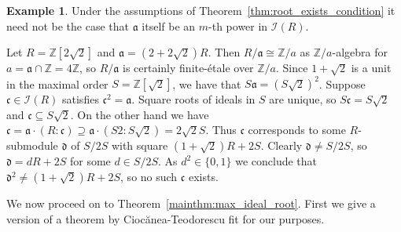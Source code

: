 \documentclass{amsart}
\theoremstyle{plain}
\theoremstyle{definition}
\newtheorem{example}[theorem]{Example}
\newcommand{\Z}{\ensuremath{\mathbb{Z}}}
\begin{document}
\begin{example}
Under the assumptions of Theorem~\ref{thm:root_exists_condition} it need not be the case that \(\mathfrak{a}\) itself be an \(m\)-th power in \(\mathcal{I}(R)\).

Let \(R=\Z[2\sqrt{2}]\) and \(\mathfrak{a}=(2+2\sqrt{2})R\). 
Then \(R/\mathfrak{a}\cong \Z/a\) as \(\Z/a\)-algebra for \(a=\mathfrak{a}\cap \Z=4\Z\), so \(R/\mathfrak{a}\) is certainly finite-\'etale over \(\Z/a\).
Since \(1+\sqrt{2}\) is a unit in the maximal order \(S=\Z[\sqrt{2}]\), we have that \(S\mathfrak{a}=(S\sqrt{2})^2\).
Suppose \(\mathfrak{c}\in\mathcal{I}(R)\) satisfies \(\mathfrak{c}^2=\mathfrak{a}\).
Square roots of ideals in \(S\) are unique, so \(S\mathfrak{c}=S\sqrt{2}\) and \(\mathfrak{c}\subseteq S\sqrt{2}\).
On the other hand we have \(\mathfrak{c}=\mathfrak{a}\cdot (R:\mathfrak{c}) \supseteq \mathfrak{a} \cdot (S2 : S\sqrt{2}) = 2\sqrt{2} S\).
Thus \(\mathfrak{c}\) corresponds to some \(R\)-submodule \(\mathfrak{d}\) of \(S/2S\) with square \((1+\sqrt{2})R+2S\).
Clearly \(\mathfrak{d}\neq S/2S\), so \(\mathfrak{d}=d R+2S\) for some \(d\in S/2S\).
As \(d^2\in\{0,1\}\) we conclude that \(\mathfrak{d}^2\neq (1+\sqrt{2})R+2S\), so no such \(\mathfrak{c}\) exists.
\end{example}

We now proceed on to Theorem~\ref{mainthm:max_ideal_root}. First we give a version of a theorem by Cioc\u{a}nea-Teodorescu \cite{Iuliana} fit for our purposes.
\end{document}
